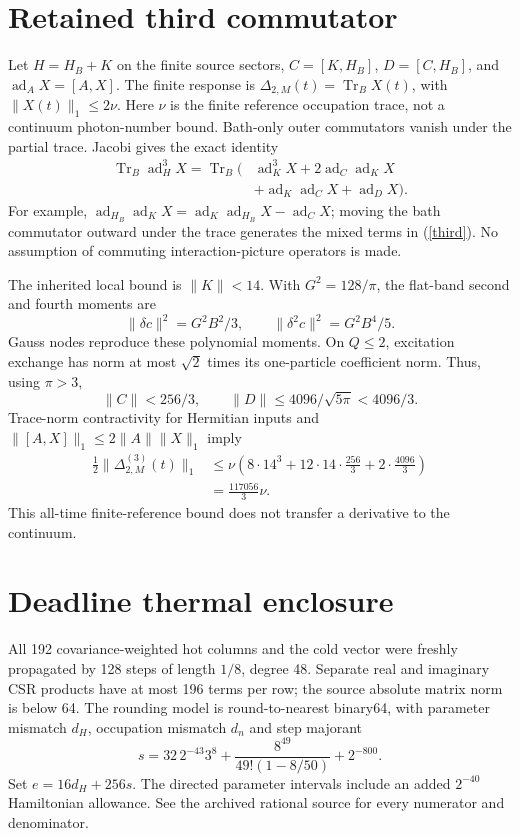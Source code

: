 \documentclass[a4paper,journal]{IEEEtran}
\newcommand{\Tr}{\operatorname{Tr}}\newcommand{\ad}{\operatorname{ad}}
\begin{document}
\section{Retained third commutator}
Let $H=H_B+K$ on the finite source sectors, $C=[K,H_B]$, $D=[C,H_B]$, and $\ad_A X=[A,X]$. The finite response is $\Delta_{2,M}(t)=\Tr_B X(t)$, with $\|X(t)\|_1\le2\nu$. Here $\nu$ is the finite reference occupation trace, not a continuum photon-number bound. Bath-only outer commutators vanish under the partial trace. Jacobi gives the exact identity
\begin{align}
\Tr_B\ad_H^3X=\Tr_B\big(&\ad_K^3X+2\ad_C\ad_KX\nonumber\\&+\ad_K\ad_CX+\ad_DX\big).\label{third}
\end{align}
For example, $\ad_{H_B}\ad_KX=\ad_K\ad_{H_B}X-\ad_CX$; moving the bath commutator outward under the trace generates the mixed terms in (\ref{third}). No assumption of commuting interaction-picture operators is made.

The inherited local bound is $\|K\|<14$. With $G^2=128/\pi$, the flat-band second and fourth moments are
\begin{equation}\|\delta c\|^2=G^2B^2/3,\qquad \|\delta^2c\|^2=G^2B^4/5.\end{equation}
Gauss nodes reproduce these polynomial moments. On $Q\le2$, excitation exchange has norm at most $\sqrt2$ times its one-particle coefficient norm. Thus, using $\pi>3$,
\begin{equation}\|C\|<256/3,\qquad \|D\|\le4096/\sqrt{5\pi}<4096/3.\end{equation}
Trace-norm contractivity for Hermitian inputs and $\|[A,X]\|_1\le2\|A\|\|X\|_1$ imply
\begin{align}
\tfrac12\|\Delta^{(3)}_{2,M}(t)\|_1
&\le\nu\left(8\cdot14^3+12\cdot14\cdot\tfrac{256}{3}+2\cdot\tfrac{4096}{3}\right)\nonumber\\
&=\tfrac{117056}{3}\nu.\label{jerk}
\end{align}
This all-time finite-reference bound does not transfer a derivative to the continuum.
\section{Deadline thermal enclosure}
All 192 covariance-weighted hot columns and the cold vector were freshly propagated by 128 steps of length $1/8$, degree 48. Separate real and imaginary CSR products have at most 196 terms per row; the source absolute matrix norm is below 64. The rounding model is round-to-nearest binary64, with parameter mismatch $d_H$, occupation mismatch $d_n$ and step majorant
\begin{equation}s=32\,2^{-43}3^8+\frac{8^{49}}{49!(1-8/50)}+2^{-800}.\end{equation}
Set $e=16d_H+256s$. The directed parameter intervals include an added $2^{-40}$ Hamiltonian allowance. See the archived rational source for every numerator and denominator.
\end{document}
